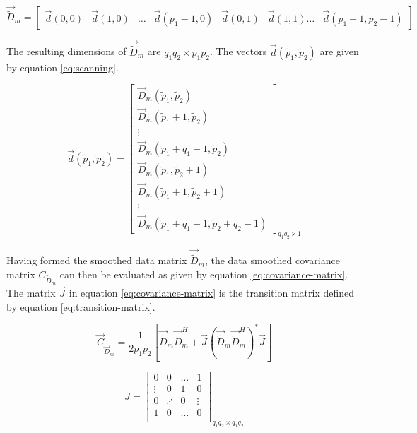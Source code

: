\begin{equation}
\label{eq:fbss-scanning}
    \vec{\tilde{D}}_m = \begin{bmatrix}  \vec{d}(0, 0) & \vec{d}(1, 0) & \ldots & \vec{d}(p_{1}-1, 0) & \vec{d}(0, 1) & \vec{d}(1, 1) \ldots & \vec{d}(p_{1}-1, p_{2}-1) \end{bmatrix}
\end{equation}

The resulting dimensions of $\vec{\tilde{D}}_m$ are $q_{1}q_{2} \times p_{1}p_{2}$.
The vectors $\vec{d}(\tilde{p}_1, \tilde{p}_2)$ are given by equation \ref{eq:scanning}.

\begin{equation}
    \label{eq:scanning}
    \vec{d}(\tilde{p}_1, \tilde{p}_2) = \begin{bmatrix} 
        \vec{D}_{m}(\tilde{p}_{1}, \tilde{p}_{2}) \\
        \vec{D}_{m}(\tilde{p}_{1}+1, \tilde{p}_{2}) \\
        \vdots \\
        \vec{D}_{m}(\tilde{p}_{1}+q_{1}-1, \tilde{p}_{2}) \\
        \vec{D}_{m}(\tilde{p}_{1}, \tilde{p}_{2}+1) \\
        \vec{D}_{m}(\tilde{p}_{1}+1, \tilde{p}_{2}+1) \\
        \vdots \\
        \vec{D}_{m}(\tilde{p}_{1}+q_{1}-1, \tilde{p}_{2}+q_{2}-1)
    \end{bmatrix}_{q_{1}q_{2} \times 1}
\end{equation}

Having formed the smoothed data matrix $\vec{\tilde{D}}_m$, the data smoothed covariance matrix $C_{\tilde{D}_m}$ 
can then be evaluated as given by equation \ref{eq:covariance-matrix}.
The matrix $\vec{J}$ in equation \ref{eq:covariance-matrix} is the transition matrix defined by equation \ref{eq:transition-matrix}.
\cite{2d-music-van-rossum, fbss-techniques}

\begin{equation}
    \label{eq:covariance-matrix}
    \vec{C}_{\tilde{\vec{D}}_m} =
        \frac{1}{2 p_{1} p_{2} }
        \left[
            \vec{\tilde{D}}_{m} \vec{\tilde{D}}_{m}^{H}
            + \vec{J}(\vec{\tilde{D}}_{m} \vec{\tilde{D}}_{m}^{H})^{*}\vec{J} 
        \right]
\end{equation}

\begin{equation}
    \label{eq:transition-matrix}
    J = \begin{bmatrix}
        0      & 0      & \ldots & 1      \\
        \vdots & 0      & 1      & 0      \\
        0      & \iddots & 0      & \vdots \\
        1      & 0      & \ldots & 0      \\
    \end{bmatrix}_{q_{1}q_{2} \times q_{1}q_{2}}
\end{equation}

